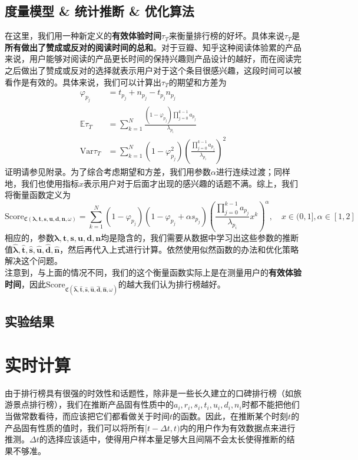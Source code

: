 \documentclass[UTF8]{ctexart}
\theoremstyle{plain}
\theoremstyle{definition}
\theoremstyle{remark}
\begin{document}
	\subsection{度量模型 \& 统计推断 \& 优化算法}
	在这里，我们用一种新定义的\textbf{有效体验时间}$\tau_T$来衡量排行榜的好坏。具体来说$\tau_T$是\textbf{所有做出了赞成或反对的阅读时间的总和}。对于豆瓣、知乎这种阅读体验累的产品来说，用户能够对阅读的产品更长时间的保持兴趣则产品设计的越好，而在阅读完之后做出了赞成或反对的选择就表示用户对于这个条目很感兴趣，这段时间可以被看作是有效的。具体来说，我们可以计算出$\tau_T$的期望和方差为
	\begin{equation}
	\begin{aligned}
	\varphi_{p_j} & = t_{p_j} + n_{p_j} - t_{p_j}n_{p_j} \\
	\mathbb{E} \tau_T & = \sum_{k=1}^N \frac{(1-\varphi_{p_j})\prod\limits_{j=0}^{k-1}a_{p_j}}{\lambda_{p_i}} \\
	\mathrm{Var} \tau_T & = \sum_{k=1}^N (1-\varphi_{p_j}^2)\left(\frac{\prod\limits_{j=0}^{k-1}a_{p_j}}{\lambda_{p_i}}\right)^2
	\end{aligned}
	\end{equation}
	证明请参见附录。为了综合考虑期望和方差，我们用参数$\alpha$进行连续过渡；同样地，我们也使用指标$x$表示用户对于后面才出现的感兴趣的话题不满。综上，我们将衡量函数定义为
	\begin{equation}
	\mathrm{Score}_{\mathfrak{C}\left(\bm{\lambda}, \bm{t}, \bm{s}, \bm{u}, \bm{d}, \bm{n},\omega\right)} = \sum_{k=1}^N (1-\varphi_{p_j})(1-\varphi_{p_j}+\alpha s_{p_j})\left(\frac{\prod\limits_{j=0}^{k-1}a_{p_j}}{\lambda_{p_i}} x^k\right)^\alpha, \quad x \in (0, 1], \alpha \in [1, 2]
	\end{equation}
	相应的，参数$\bm{\lambda}, \bm{t}, \bm{s}, \bm{u}, \bm{d}, \bm{n}$均是隐含的，我们需要从数据中学习出这些参数的推断值$\bm{\hat{\lambda}}, \bm{\hat{t}}, \bm{\hat{s}}, \bm{\hat{u}}, \bm{\hat{d}}, \bm{\hat{n}}$，然后再代入上式进行计算。依然使用似然函数的办法和优化策略解决这个问题。 \\
	
	注意到，与上面的情况不同，我们的这个衡量函数实际上是在测量用户的\textbf{有效体验时间}，因此$\mathrm{Score}_{\mathfrak{C}\left(\bm{\hat{\lambda}}, \bm{\hat{t}}, \bm{\hat{s}}, \bm{\hat{u}}, \bm{\hat{d}}, \bm{\hat{n}},\omega\right)}$的越大我们认为排行榜越好。
	\subsection{实验结果}
	\section{实时计算}
	由于排行榜具有很强的时效性和话题性，除非是一些长久建立的口碑排行榜（如旅游景点排行榜），我们在推断产品固有性质中的$a_i,r_i,s_i,t_i,u_i,d_i,n_i$时都不能把他们当做常数看待，而应该把它们都看做关于时间$t$的函数。因此，在推断某个时刻$t$的产品固有性质的值时，我们可以将所有$[t-\Delta t,t)$内的用户作为有效数据点来进行推测。$\Delta t$的选择应该适中，使得用户样本量足够大且间隔不会太长使得推断的结果不够准。
\end{document}
